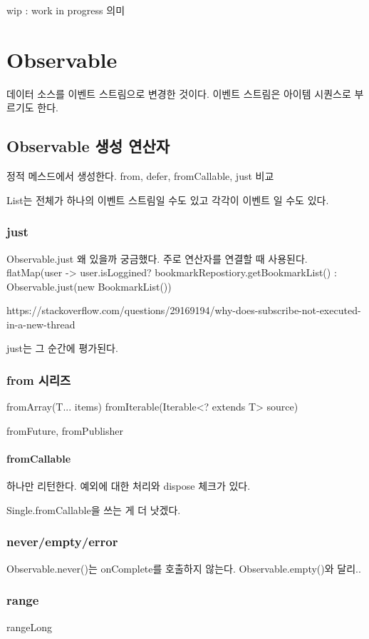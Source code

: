 \documentclass{book}
\begin{document}
wip : work in progress 의미


\chapter{Observable}
데이터 소스를 이벤트 스트림으로 변경한 것이다.
이벤트 스트림은 아이템 시퀀스로 부르기도 한다.

\section{Observable 생성 연산자}
정적 메스드에서 생성한다.
from, defer, fromCallable, just 비교

List는 전체가 하나의 이벤트 스트림일 수도 있고 각각이 이벤트 일 수도 있다.

\subsection{just}
Observable.just
왜 있을까 궁금했다. 주로 연산자를 연결할 때 사용된다.
flatMap(user -> user.isLoggined? bookmarkRepostiory.getBookmarkList() : Observable.just(new BookmarkList())

https://stackoverflow.com/questions/29169194/why-does-subscribe-not-executed-in-a-new-thread

just는 그 순간에 평가된다.

\subsection{from 시리즈}
fromArray(T... items)
fromIterable(Iterable<? extends T> source)

fromFuture, fromPublisher

\subsubsection{fromCallable}
하나만 리턴한다. 예외에 대한 처리와 dispose 체크가 있다.

Single.fromCallable을 쓰는 게 더 낫겠다.

\subsection{never/empty/error}
Observable.never()는 onComplete를 호출하지 않는다. Observable.empty()와 달리..

\subsection{range}
rangeLong
\end{document}
